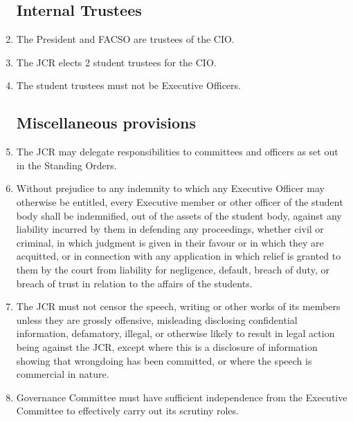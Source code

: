 \documentclass[12pt]{article}
\begin{document}
\begin{enumerate}
    \subsection{Internal Trustees}
    \item The President and FACSO are trustees of the CIO.
    \item The JCR elects 2 student trustees for the CIO.
    \item The student trustees must not be Executive Officers.

    \subsection{Miscellaneous provisions}
    \item The JCR may delegate responsibilities to committees and officers as set out in the Standing Orders.
    \item Without prejudice to any indemnity to which any Executive Officer may otherwise be entitled, every Executive member or other officer of the student body shall be indemnified, out of the assets of the student body, against any liability incurred by them in defending any proceedings, whether civil or criminal, in which judgment is given in their favour or in which they are acquitted, or in connection with any application in which relief is granted to them by the court from liability for negligence, default, breach of duty, or breach of trust in relation to the affairs of the students.
    \item The JCR must not censor the speech, writing or other works of its members unless they are grossly offensive, misleading disclosing confidential information, defamatory, illegal, or otherwise likely to result in legal action being against the JCR, except where this is a disclosure of information showing that wrongdoing has been committed, or where the speech is commercial in nature.
    \item Governance Committee must have sufficient independence from the Executive Committee to effectively carry out its scrutiny roles.
\end{enumerate}
\newpage
\end{document}
